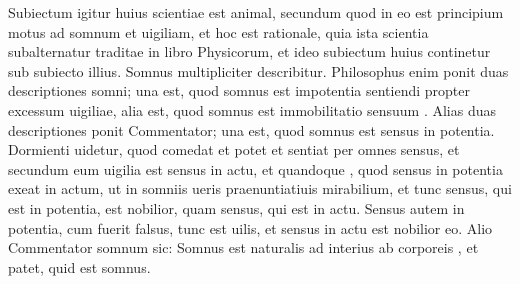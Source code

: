 \documentclass{article}
\begin{document}
\beginnumbering
\pstart
Subiectum igitur huius scientiae est animal, secundum quod in
eo est principium motus ad somnum et uigiliam, et hoc est rationale,
quia ista scientia subalternatur
 traditae in libro
Physicorum, et ideo subiectum huius continetur sub subiecto illius.
Somnus multipliciter describitur. Philosophus enim ponit duas
descriptiones somni; una est, quod somnus est impotentia sentiendi
propter excessum uigiliae, alia est, quod somnus est immobilitatio
sensuum . Alias duas descriptiones ponit Commentator;
una est, quod somnus est sensus in potentia. Dormienti
 uidetur, quod comedat et potet
et sentiat per omnes  sensus, et secundum eum uigilia est sensus in
actu, et quandoque ,
quod sensus in potentia exeat in actum, ut in somniis ueris
praenuntiatiuis mirabilium, et tunc sensus, qui est in potentia, est
nobilior, quam sensus, qui est in actu. Sensus autem in potentia, cum
fuerit falsus, tunc est uilis, et sensus in actu est nobilior eo. Alio
 Commentator somnum
sic: Somnus est 
 naturalis ad interius
ab  corporeis
,
et  patet, quid est somnus.
\pend
\endnumbering
\end{document}
